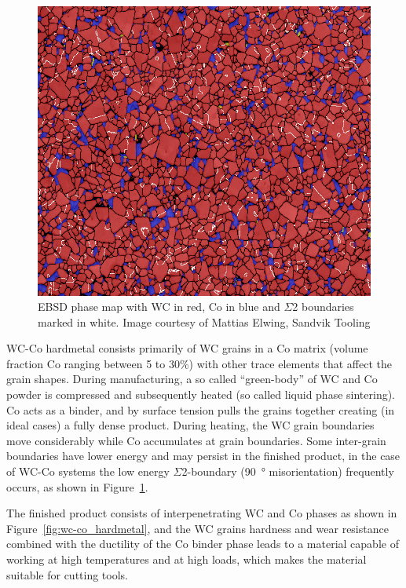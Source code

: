 \documentclass[3p,12pt]{elsarticle}
\begin{document}
\begin{figure}[htbp!]
\centering
\includegraphics[width=0.5\linewidth]{wc-co-sigma2}
\caption{EBSD phase map with WC in red, Co in blue and $\Sigma$2 boundaries marked in white. Image courtesy of Mattias Elwing, Sandvik Tooling} \label{fig:sigma_2}
\end{figure}

WC-Co hardmetal consists primarily of WC grains in a Co matrix (volume fraction Co ranging between 5 to 30\%) with other trace elements that affect the grain shapes.
During manufacturing, a so called ``green-body'' of WC and Co powder is compressed and subsequently heated (so called liquid phase sintering).
Co acts as a binder, and by surface tension pulls the grains together creating (in ideal cases) a fully dense product.
During heating, the WC grain boundaries move considerably while Co accumulates at grain boundaries.
Some inter-grain boundaries have lower energy and may persist in the finished product, in the case of WC-Co systems the low energy $\Sigma$2-boundary (\SI{90}{\degree} misorientation) frequently occurs, as shown in Figure~\ref{fig:sigma_2}.

The finished product consists of interpenetrating WC and Co phases as shown in Figure~\ref{fig:wc-co_hardmetal}, and the WC grains hardness and wear resistance combined with the ductility of the Co binder phase leads to a material capable of working at high temperatures and at high loads, which makes the material suitable for cutting tools.
\end{document}
